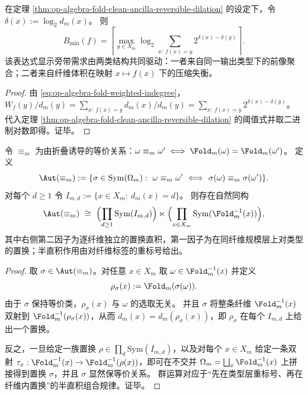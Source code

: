 \begin{corollary}[旁带预算的纤维势分解]\label{cor:op-algebra-fold-clean-ancilla-budget-decomposition}
在定理 \ref{thm:op-algebra-fold-clean-ancilla-reversible-dilation} 的设定下，令
\(
\delta(x):=\log_2 d_m(x)
\)。
则
\[
B_{\min}(f)
=
\left\lceil
\max_{y\in X_m}
\log_2\!\sum_{x:\ f(x)=y} 2^{\delta(x)-\delta(y)}
\right\rceil.
\]
该表达式显示旁带需求由两类结构共同驱动：一者来自同一输出类型下的前像聚合；二者来自纤维体积在映射 \(x\mapsto f(x)\) 下的压缩失衡。
\end{corollary}
\begin{proof}
由 \eqref{eq:op-algebra-fold-weighted-indegree}，
\(
W_f(y)/d_m(y)=\sum_{x:\ f(x)=y} d_m(x)/d_m(y)
=\sum_{x:\ f(x)=y}2^{\delta(x)-\delta(y)}
\)。
代入定理 \ref{thm:op-algebra-fold-clean-ancilla-reversible-dilation} 的阈值式并取二进制对数即得。证毕。
\end{proof}

\begin{theorem}[折叠等价自同构的半直积分解]\label{thm:op-algebra-fold-equivalence-aut-semidir}
令 \(\equiv_m\) 为由折叠诱导的等价关系：\(\omega\equiv_m\omega'\iff \Fold_m(\omega)=\Fold_m(\omega')\)。
定义
\[
\Aut(\equiv_m):=\{\sigma\in\mathrm{Sym}(\Omega_m):\ \omega\equiv_m\omega'\ \Longleftrightarrow\ \sigma(\omega)\equiv_m\sigma(\omega')\}.
\]
对每个 \(d\ge 1\) 令
\(
I_{m,d}:=\{x\in X_m:\ d_m(x)=d\}
\)。
则存在自然同构
\[
\Aut(\equiv_m)
\ \cong\
\Bigl(\prod_{d\ge 1}\mathrm{Sym}(I_{m,d})\Bigr)\ltimes\Bigl(\prod_{x\in X_m}\mathrm{Sym}(\Fold_m^{-1}(x))\Bigr),
\]
其中右侧第二因子为逐纤维独立的置换直积，第一因子为在同纤维规模层上对类型的置换；半直积作用由对纤维标签的重标号给出。
\end{theorem}
\begin{proof}
取 \(\sigma\in\Aut(\equiv_m)\)。对任意 \(x\in X_m\) 取 \(\omega\in \Fold_m^{-1}(x)\) 并定义
\[
\rho_\sigma(x):=\Fold_m(\sigma(\omega)).
\]
由于 \(\sigma\) 保持等价类，\(\rho_\sigma(x)\) 与 \(\omega\) 的选取无关。
并且 \(\sigma\) 将整条纤维 \(\Fold_m^{-1}(x)\) 双射到 \(\Fold_m^{-1}(\rho_\sigma(x))\)，从而 \(d_m(x)=d_m(\rho_\sigma(x))\)，即 \(\rho_\sigma\) 在每个 \(I_{m,d}\) 上给出一个置换。
\par
反之，一旦给定一族置换 \(\rho\in\prod_d\mathrm{Sym}(I_{m,d})\)，以及对每个 \(x\in X_m\) 给定一条双射
\(
\tau_x:\Fold_m^{-1}(x)\to \Fold_m^{-1}(\rho(x))
\)，即可在不交并 \(\Omega_m=\bigsqcup_x\Fold_m^{-1}(x)\) 上拼接得到置换 \(\sigma\)，并且 \(\sigma\) 显然保等价关系。
群运算对应于“先在类型层重标号、再在纤维内置换”的半直积组合规律。证毕。
\end{proof}

